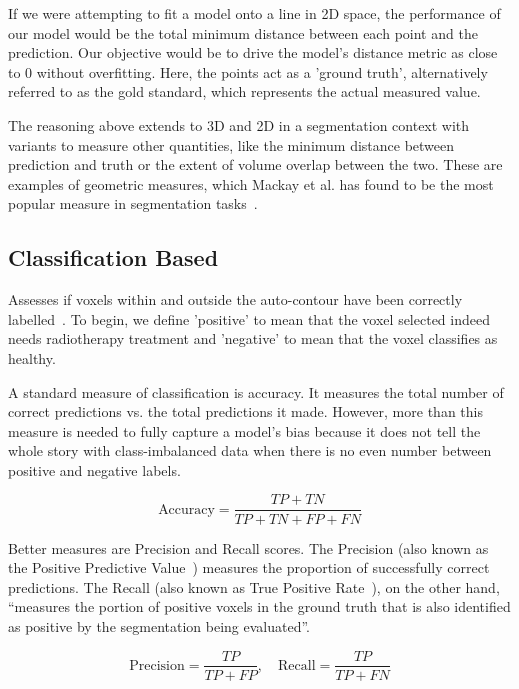 \documentclass[12pt,twoside]{report}
\begin{document}
If we were attempting to fit a model onto a line in 2D space, the performance of our model would be the total minimum distance between each point and the prediction. Our objective would be to drive the model's distance metric as close to 0 without overfitting. Here, the points act as a 'ground truth', alternatively referred to as the gold standard, which represents the actual measured value.

The reasoning above extends to 3D and 2D in a segmentation context with variants to measure other quantities, like the minimum distance between prediction and truth or the extent of volume overlap between the two. These are examples of geometric measures, which Mackay et al. has found to be the most popular measure in segmentation tasks~\cite{review-metrics}.

\subsection{Classification Based}\label{sect:classification-based}

Assesses if voxels within and outside the auto-contour have been correctly labelled~\cite{review-metrics}. To begin, we define 'positive' to mean that the voxel selected indeed needs radiotherapy treatment and 'negative' to mean that the voxel classifies as healthy.

A standard measure of classification is accuracy. It measures the total number of correct predictions vs. the total predictions it made. However, more than this measure is needed to fully capture a model's bias because it does not tell the whole story with class-imbalanced data when there is no even number between positive and negative labels.

\begin{equation*}
 \text{Accuracy} = \frac{TP + TN}{TP + TN + FP + FN}
\end{equation*}

Better measures are Precision and Recall scores. The Precision (also known as the Positive Predictive Value~\cite{evaluation-metrics}) measures the proportion of successfully correct predictions. The Recall (also known as True Positive Rate~\cite{evaluation-metrics}), on the other hand, ``measures the portion of positive voxels in the ground truth that is also identified as positive by the segmentation being evaluated''.

\begin{equation*}
 \text{Precision} = \frac{TP}{TP+FP}, \quad \text{Recall} = \frac{TP}{TP+FN}
\end{equation*}
\end{document}
